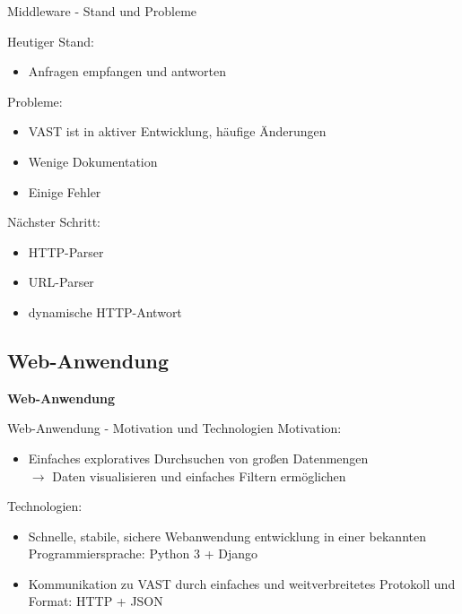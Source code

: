 \documentclass[9pt]{beamer}
\begin{document}
\begin{frame}{Middleware - Stand und Probleme}{}

	Heutiger Stand:
	\begin{itemize}
		\item Anfragen empfangen und antworten
	\end{itemize}

	Probleme:
	\begin{itemize}
		\item VAST ist in aktiver Entwicklung, häufige Änderungen
		\item Wenige Dokumentation
		\item Einige Fehler
	\end{itemize}
	
	Nächster Schritt:
	\begin{itemize}
		\item HTTP-Parser
		\item URL-Parser
		\item dynamische HTTP-Antwort
	\end{itemize}

\end{frame}

\subsection{Web-Anwendung}

	\begin{frame}{}
		\begin{center}
			\LARGE \textbf{Web-Anwendung}
		\end{center}
	\end{frame}

\begin{frame}{Web-Anwendung - Motivation und Technologien}{}
	Motivation:
	\begin{itemize}
		\item Einfaches exploratives Durchsuchen von großen Datenmengen\\
			$\rightarrow$ Daten visualisieren und einfaches Filtern ermöglichen
	\end{itemize}
	Technologien:
	\begin{itemize}
		\item Schnelle, stabile, sichere Webanwendung entwicklung in einer bekannten Programmiersprache:  Python 3 + Django
			
		\item Kommunikation zu VAST durch einfaches  und weitverbreitetes Protokoll und Format: HTTP + JSON
	\end{itemize}
\end{frame}
\end{document}
